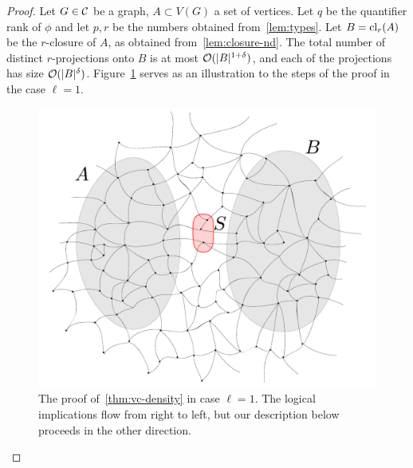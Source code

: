 \begin{proof}
%
%
%
%
Let $G\in\cal C$ be a graph, $A\subset V(G)$ a set of vertices.
	Let $q$ be the quantifier rank of $\phi$ and let 
$p,r$ be the numbers obtained from~\cref{lem:types}.
Let $B=\cl_r(A)$ be the $r$-closure of $A$, as obtained from~\cref{lem:closure-nd}.
  The total number of distinct $r$-projections onto $B$ 
  is at most $\Oof(|B|^{1+\delta})$, and each of the projections has size $\Oof(|B|^{\delta})$.
  	   Figure~\ref{fig:sketch} serves as  an illustration to the steps of the proof in the case $\ell=1$.
  	   \begin{figure}[h!]
  	   	\centering
  	   		\includegraphics[scale=0.346,page=4]{pics}
  			\caption{The proof of~\cref{thm:vc-density} in case $\ell=1$. 
  The logical implications flow from right to left,
  but our description below proceeds in the other direction.
  			}
  	   	\label{fig:sketch}
  	   \end{figure}
  

\end{proof}
